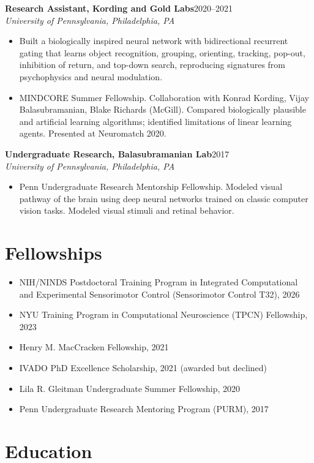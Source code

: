 \documentclass[10pt]{article}
\newcommand{\cvrole}[3]{%
  \textbf{#1}\hfill #3\\[-0.15em]
  \textit{#2}\par
}
\begin{document}
\cvrole{Research Assistant, Kording and Gold Labs}{University of Pennsylvania, Philadelphia, PA}{2020--2021}
\begin{itemize}
    \item Built a biologically inspired neural network with bidirectional recurrent gating that learns object recognition, grouping, orienting, tracking, pop-out, inhibition of return, and top-down search, reproducing signatures from psychophysics and neural modulation.
    \item MINDCORE Summer Fellowship. Collaboration with Konrad Kording, Vijay Balasubramanian, Blake Richards (McGill). Compared biologically plausible and artificial learning algorithms; identified limitations of linear learning agents. Presented at Neuromatch 2020.
\end{itemize}

\cvrole{Undergraduate Research, Balasubramanian Lab}{University of Pennsylvania, Philadelphia, PA}{2017}
\begin{itemize}
    \item Penn Undergraduate Research Mentorship Fellowship. Modeled visual pathway of the brain using deep neural networks trained on classic computer vision tasks. Modeled visual stimuli and retinal behavior.
\end{itemize}


\section{Fellowships}
\begin{itemize}
    \item NIH/NINDS Postdoctoral Training Program in Integrated Computational and Experimental Sensorimotor Control (Sensorimotor Control T32), 2026
    \item NYU Training Program in Computational Neuroscience (TPCN) Fellowship, 2023
    \item Henry M. MacCracken Fellowship, 2021
    \item IVADO PhD Excellence Scholarship, 2021 (awarded but declined)
    \item Lila R. Gleitman Undergraduate Summer Fellowship, 2020
    \item Penn Undergraduate Research Mentoring Program (PURM), 2017
\end{itemize}

\section{Education}
\end{document}
